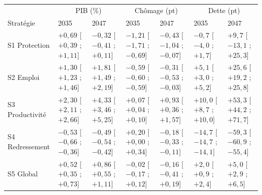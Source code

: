 \begin{tabular}{lllllll}\toprule & \multicolumn{2}{c}{PIB (\%)} & \multicolumn{2}{c}{Chômage (pt)} & \multicolumn{2}{c}{Dette (pt)}\\ Stratégie & 2035 & 2047 & 2035 & 2047 & 2035 & 2047\\ \midrule
S1 Protection & $+0{,}69$ [$+0{,}39$ ; $+1{,}11$] & $-0{,}32$ [$-0{,}41$ ; $+0{,}11$] & $-1{,}21$ [$-1{,}71$ ; $-0{,}69$] & $-0{,}43$ [$-1{,}04$ ; $-0{,}07$] & $-0{,}7$ [$-4{,}0$ ; $+1{,}7$] & $+9{,}7$ [$-13{,}1$ ; $+25{,}3$]\\
S2 Emploi & $+1{,}30$ [$+1{,}23$ ; $+1{,}46$] & $+1{,}81$ [$+1{,}49$ ; $+2{,}19$] & $-0{,}59$ [$-0{,}60$ ; $-0{,}59$] & $-0{,}31$ [$-0{,}53$ ; $-0{,}03$] & $+5{,}1$ [$+3{,}0$ ; $+5{,}2$] & $+25{,}6$ [$+19{,}2$ ; $+25{,}8$]\\
S3 Productivité & $+2{,}30$ [$+2{,}11$ ; $+2{,}66$] & $+4{,}33$ [$+3{,}46$ ; $+5{,}25$] & $+0{,}07$ [$+0{,}04$ ; $+0{,}10$] & $+0{,}93$ [$+0{,}36$ ; $+1{,}57$] & $+10{,}0$ [$+8{,}7$ ; $+10{,}0$] & $+53{,}3$ [$+44{,}2$ ; $+71{,}7$]\\
S4 Redressement & $-0{,}53$ [$-0{,}66$ ; $-0{,}36$] & $-0{,}49$ [$-0{,}54$ ; $-0{,}42$] & $+0{,}20$ [$+0{,}00$ ; $+0{,}34$] & $-0{,}18$ [$-0{,}33$ ; $-0{,}11$] & $-14{,}7$ [$-14{,}7$ ; $-14{,}1$] & $-59{,}3$ [$-60{,}9$ ; $-55{,}4$]\\
S5 Global & $+0{,}52$ [$+0{,}35$ ; $+0{,}73$] & $+0{,}86$ [$+0{,}55$ ; $+1{,}11$] & $-0{,}02$ [$-0{,}17$ ; $+0{,}12$] & $-0{,}16$ [$-0{,}41$ ; $+0{,}19$] & $+2{,}0$ [$+0{,}9$ ; $+2{,}4$] & $+5{,}0$ [$+2{,}9$ ; $+6{,}5$]\\\bottomrule\end{tabular}